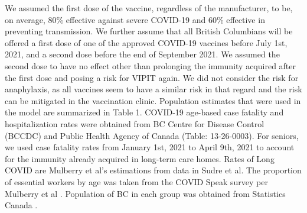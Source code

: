 \documentclass[]{interact}
\theoremstyle{plain}%
\theoremstyle{definition}
\theoremstyle{remark}
\begin{document}
\begin{table}
{\begin{tabular}{llllll}
 \bottomrule 

\end{tabular}}
\label{harm-param}
\end{table}

We assumed the first dose of the vaccine, regardless of the
manufacturer, to be, on average, 80\% effective against severe COVID-19
and 60\% effective in preventing transmission. We further assume that
all British Columbians will be offered a first dose of one of the
approved COVID-19 vaccines before July 1st, 2021, and a second dose
before the end of September 2021. We assumed the second dose to have no
effect other than prolonging the immunity acquired after the first dose
and posing a risk for VIPIT again. We did not consider the risk for
anaphylaxis, as all vaccines seem to have a similar risk in that regard
and the risk can be mitigated in the vaccination clinic. Population
estimates that were used in the model are summarized in Table 1.
COVID-19 age-based case fatality and hospitalization rates were obtained
from BC Centre for Disease Control (BCCDC) \citep{bccdc_british_2021}
and Public Health Agency of Canada (Table:
13-26-0003)\citep{statistics_canada_preliminary_2021}. For seniors, we
used case fatality rates from January 1st, 2021 to April 9th, 2021 to
account for the immunity already acquired in long-term care homes. Rates
of Long COVID are Mulberry et al's estimations from data in Sudre et
al\citep{sudre_attributes_2021}. The proportion of essential workers by
age was taken from the COVID Speak survey per Mulberry et al
\citep{mulberry_vaccine_2021}. Population of BC in each group was
obtained from Statistics Canada \citep{statistics_canada_census_2017}.
\end{document}
